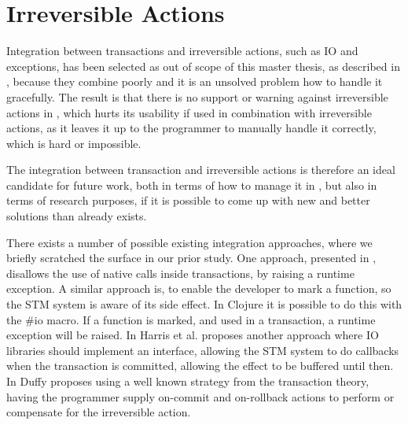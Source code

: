 \section{Irreversible Actions}
Integration between transactions and irreversible actions, such as \ac{IO} and exceptions, has been selected as out of scope of this master thesis, as described in , because they combine poorly and it is an unsolved problem how to handle it gracefully\cite{harris2005exceptions}. The result is that there is no support or warning against irreversible actions in \stmname, which hurts its usability if used in combination with irreversible actions, as it leaves it up to the programmer to manually handle it correctly, which is hard or impossible.

The integration between transaction and irreversible actions is therefore an ideal candidate for future work, both in terms of how to manage it in \stmname, but also in terms of research purposes, if it is possible to come up with new and better solutions than already exists. 

There exists a number of possible existing integration approaches, where we briefly scratched the surface in our prior study\cite[p. 51-52]{dpt907e14trending}. One approach, presented in \cite[p. 4]{harris2003language}, disallows the use of native calls inside transactions, by raising a runtime exception. A similar approach is, to enable the developer to mark a function, so the \ac{STM} system is aware of its side effect. In Clojure it is possible to do this with the \#io macro. If a function is marked, and used in a transaction, a runtime exception will be raised. In \cite{harris2005exceptions} Harris et al. proposes another approach where \ac{IO} libraries should implement an interface, allowing the \ac{STM} system to do callbacks when the transaction is committed, allowing the effect to be buffered until then. In \cite{duffy2010stmnet} Duffy proposes using a well known strategy from the transaction theory\cite{reuter1993transaction}, having the programmer supply on-commit and on-rollback actions to perform or compensate for the irreversible action.

\worksheetend
